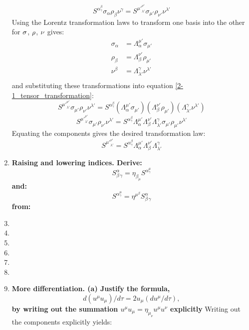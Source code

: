 \documentclass[9pt]{report}
\begin{document}
\begin{enumerate}
  \begin{equation}
    S^\alpha^\beta_\gamma \sigma_\alpha \rho_\beta \nu^\gamma = S^{\mu'}^{\nu'}_{\lambda'} \sigma_{\mu'} \rho_{\nu'} \nu^{\lambda'} \label{2-1_tensor_transformation}
  \end{equation}
  Using the Lorentz transformation laws to transform one basis into the other
  for $\bf{\sigma}$, $\bf{\rho}$, $\bf{\nu}$ gives:
  \[
  \begin{align}
    \sigma_\alpha &= \Lambda^{\mu'}_{\alpha} \sigma_{\mu'} \\
    \rho_\beta &= \Lambda^{\nu'}_{\beta} \rho_{\mu'} \\
    \nu^\beta &= \Lambda^{\gamma}_{\lambda'} \nu^{\lambda'} \\
  \end{align}
  \]
  and substituting these transformations into equation \ref{2-1_tensor_transformation}:
  \[
    S^{\mu'}^{\nu'}_{\lambda'} \sigma_{\mu'} \rho_{\nu'} \nu^{\lambda'} = S^\alpha^\beta_\gamma (\Lambda^{\mu'}_{\alpha} \sigma_{\mu'}) (\Lambda^{\nu'}_{\beta} \rho_{\mu'}) (\Lambda^{\gamma}_{\lambda'} \nu^{\lambda'})
  \]
  \[
    S^{\mu'}^{\nu'}_{\lambda'} \sigma_{\mu'} \rho_{\nu'} \nu^{\lambda'} = S^\alpha^\beta_\gamma \Lambda^{\mu'}_{\alpha} \Lambda^{\nu'}_{\beta} \Lambda^{\gamma}_{\lambda'} \sigma_{\mu'} \rho_{\mu'} \nu^{\lambda'}
  \]
  Equating the components gives the desired transformation law:
  \[
    S^{\mu'}^{\nu'}_{\lambda'} = S^\alpha^\beta_\gamma \Lambda^{\mu'}_{\alpha} \Lambda^{\nu'}_{\beta} \Lambda^{\gamma}_{\lambda'}
  \]
\item  \textbf{Raising and lowering indices. Derive:}
  \begin{equation}
    S^\alpha_\beta_\gamma = \eta_\beta_\mu S^\alpha^\mu_\gamma
  \end{equation}
  \textbf{and:}
  \begin{equation}
    S^\alpha^\mu_\gamma = \eta^\mu^\beta S^\alpha_\beta_\gamma
  \end{equation}
  \textbf{from:}
\item
\item
\item
\item
\item
\item
\item \textbf{More differentiation. (a) Justify the formula,}
  \[
    d(u^\mu u_\mu) / d\tau = 2 u_\mu (d u^\mu / d\tau),
  \]
  \textbf{by writing out the summation $u^\mu u_\mu = \eta_\mu_\nu u^\mu u^\nu$ explicitly}
  Writing out the components explicitly yields:

\end{enumerate}
\end{document}
